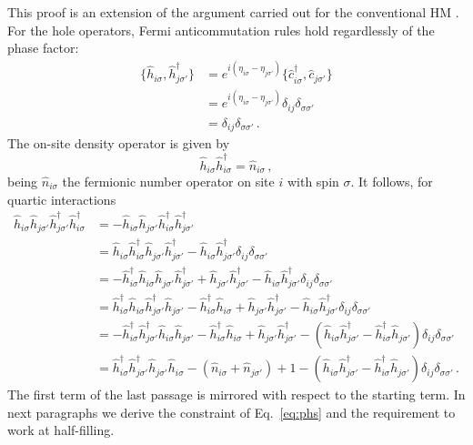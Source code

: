 \begin{tabproof}

	This proof is an extension of the argument carried out for the conventional HM \cite{arovas2022hubbard}. For the hole operators, Fermi anticommutation rules hold regardlessly of the phase factor:
	\[
	\begin{aligned}
		\lbrace \hat h_{i\sigma}, \hat h_{j\sigma'}^\dagger \rbrace &= e^{i(\eta_{i\sigma}-\eta_{j\sigma'})} \lbrace \hat c_{i\sigma}^\dagger, \hat c_{j\sigma'} \rbrace \\
		&= e^{i(\eta_{i\sigma}-\eta_{j\sigma'})} \delta_{ij} \delta_{\sigma\sigma'} \\
		&= \delta_{ij} \delta_{\sigma\sigma'} \, .
	\end{aligned}
	\]
	The on-site density operator is given by
	\[
		\hat h_{i\sigma} \hat h_{i\sigma}^\dagger = \hat n_{i\sigma} \, ,
	\]
	being $\hat n_{i\sigma}$ the fermionic number operator on site $i$ with spin $\sigma$. It follows, for quartic interactions
	\begin{align}
		\hat h_{i\sigma} \hat h_{j\sigma'} \hat h_{j\sigma'}^\dagger \hat h_{i\sigma}^\dagger &= -\hat h_{i\sigma} \hat h_{j\sigma'} \hat h_{i\sigma}^\dagger \hat h_{j\sigma'}^\dagger \nonumber \\
		&= \hat h_{i\sigma} \hat h_{i\sigma}^\dagger \hat h_{j\sigma'} \hat h_{j\sigma'}^\dagger - \hat h_{i\sigma} \hat h_{j\sigma'}^\dagger \delta_{ij}\delta_{\sigma\sigma'} \nonumber \\
		&= - \hat h_{i\sigma}^\dagger \hat h_{i\sigma} \hat h_{j\sigma'} \hat h_{j\sigma'}^\dagger + \hat h_{j\sigma'} \hat h_{j\sigma'}^\dagger - \hat h_{i\sigma} \hat h_{j\sigma'}^\dagger \delta_{ij}\delta_{\sigma\sigma'} \nonumber \\
		&= \hat h_{i\sigma}^\dagger \hat h_{i\sigma} \hat h_{j\sigma'}^\dagger \hat h_{j\sigma'} - \hat h_{i\sigma}^\dagger \hat h_{i\sigma} + \hat h_{j\sigma'} \hat h_{j\sigma'}^\dagger - \hat h_{i\sigma} \hat h_{j\sigma'}^\dagger \delta_{ij}\delta_{\sigma\sigma'} \nonumber \\
		&= - \hat h_{i\sigma}^\dagger \hat h_{j\sigma'}^\dagger \hat h_{i\sigma} \hat h_{j\sigma'} - \hat h_{i\sigma}^\dagger \hat h_{i\sigma} + \hat h_{j\sigma'} \hat h_{j\sigma'}^\dagger - \left(
			\hat h_{i\sigma} \hat h_{j\sigma'}^\dagger - \hat h_{i\sigma}^\dagger \hat h_{j\sigma'}
		\right) \delta_{ij}\delta_{\sigma\sigma'} \nonumber \\
		&= \hat h_{i\sigma}^\dagger \hat h_{j\sigma'}^\dagger \hat h_{j\sigma'} \hat h_{i\sigma} - \left(
			\hat n_{i\sigma} + \hat n_{j\sigma'}
		\right) + 1 - \left(
			\hat h_{i\sigma} \hat h_{j\sigma'}^\dagger - \hat h_{i\sigma}^\dagger \hat h_{j\sigma'}
		\right) \delta_{ij}\delta_{\sigma\sigma'} \, . \label{eq:phs-hhhh-chain}
	\end{align}
	The first term of the last passage is mirrored with respect to the starting term. In next paragraphs we derive the constraint of Eq.~\eqref{eq:phs} and the requirement to work at half-filling.
	

\end{tabproof}
